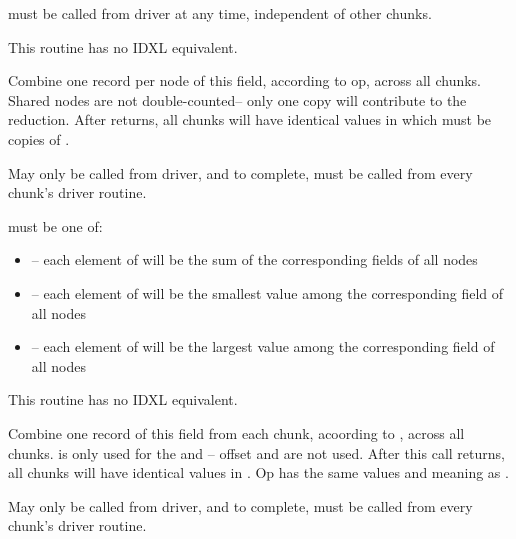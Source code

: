 \documentclass[10pt]{article}
\begin{document}
      must be called from driver at any time, independent
     of other chunks. 
     
     This routine has no IDXL equivalent.


Combine one record per node of this field, according to op, across all chunks.
Shared nodes are not double-counted-- only one copy will contribute to the
reduction.  After  returns, all chunks will have identical
values in  which must be  copies of .

     May only be called from driver, and to complete, must be called
     from every chunk's driver routine.

      must be one of:

\begin{itemize}
        \item {}-- each element of  will be the sum 
of the corresponding fields of all nodes
        \item {}-- each element of  will be the 
smallest value among the corresponding field of all nodes
        \item {}-- each element of  will be the largest 
value among the corresponding field of all nodes
\end{itemize}

     This routine has no IDXL equivalent.



     Combine one record of this field from each chunk, acoording to , 
 across all chunks.
 is only used for the  and -- offset and
 are not used.  After this call returns, all chunks will have
identical values in .  Op has the same values and meaning as
.

     May only be called from driver, and to complete, must be called
     from every chunk's driver routine.
\end{document}
